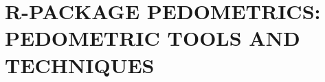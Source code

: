 \artigofalse
\chapter{R-PACKAGE PEDOMETRICS: PEDOMETRIC TOOLS AND TECHNIQUES}
\label{apen:pedometrics}


